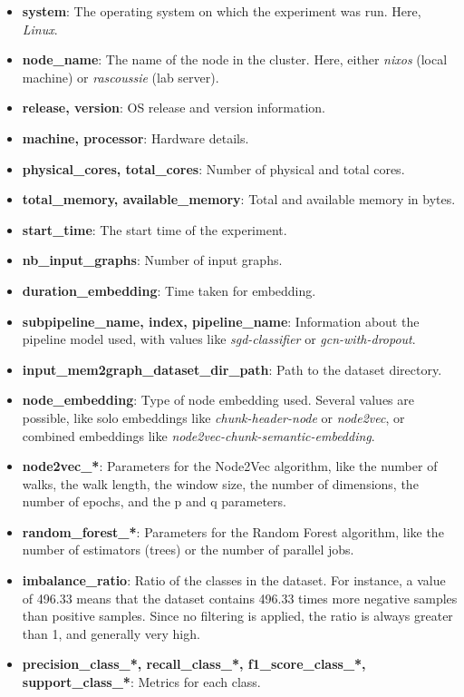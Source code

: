 \begin{itemize}
    \item \textbf{system}: The operating system on which the experiment was run. Here, \textit{Linux}.
    \item \textbf{node\_name}: The name of the node in the cluster. Here, either \textit{nixos} (local machine) or \textit{rascoussie} (lab server).
    \item \textbf{release, version}: OS release and version information.
    \item \textbf{machine, processor}: Hardware details.
    \item \textbf{physical\_cores, total\_cores}: Number of physical and total cores.
    \item \textbf{total\_memory, available\_memory}: Total and available memory in bytes.
    \item \textbf{start\_time}: The start time of the experiment.
    \item \textbf{nb\_input\_graphs}: Number of input graphs.
    \item \textbf{duration\_embedding}: Time taken for embedding.
    \item \textbf{subpipeline\_name, index, pipeline\_name}: Information about the pipeline model used, with values like \textit{sgd-classifier} or \textit{gcn-with-dropout}.
    \item \textbf{input\_mem2graph\_dataset\_dir\_path}: Path to the dataset directory.
    \item \textbf{node\_embedding}: Type of node embedding used. Several values are possible, like solo embeddings like \textit{chunk-header-node} or \textit{node2vec}, or combined embeddings like \textit{node2vec-chunk-semantic-embedding}.
    \item \textbf{node2vec\_*}: Parameters for the Node2Vec algorithm, like the number of walks, the walk length, the window size, the number of dimensions, the number of epochs, and the p and q parameters.
    \item \textbf{random\_forest\_*}: Parameters for the Random Forest algorithm, like the number of estimators (trees) or the number of parallel jobs.
    \item \textbf{imbalance\_ratio}: Ratio of the classes in the dataset. For instance, a value of 496.33 means that the dataset contains 496.33 times more negative samples than positive samples. Since no filtering is applied, the ratio is always greater than 1, and generally very high.
    \item \textbf{precision\_class\_*, recall\_class\_*, f1\_score\_class\_*, support\_class\_*}: Metrics for each class.

\end{itemize}

